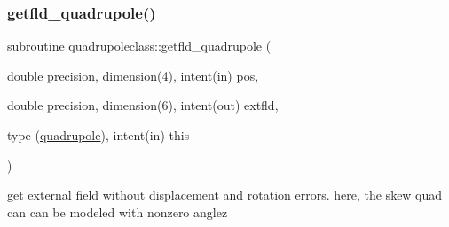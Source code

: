 \mbox{\label{namespacequadrupoleclass_a1d1bf0b4ea88a1cd0c0832a178fc80e5}} 
\subsubsection{\texorpdfstring{getfld\_quadrupole()}{getfld\_quadrupole()}}
{\footnotesize\ttfamily subroutine quadrupoleclass\+::getfld\+\_\+quadrupole (\begin{DoxyParamCaption}\item[{double precision, dimension(4), intent(in)}]{pos,  }\item[{double precision, dimension(6), intent(out)}]{extfld,  }\item[{type (\mbox{\hyperlink{namespacequadrupoleclass_structquadrupoleclass_1_1quadrupole}{quadrupole}}), intent(in)}]{this }\end{DoxyParamCaption})}



get external field without displacement and rotation errors. here, the skew quad can can be modeled with nonzero anglez 

